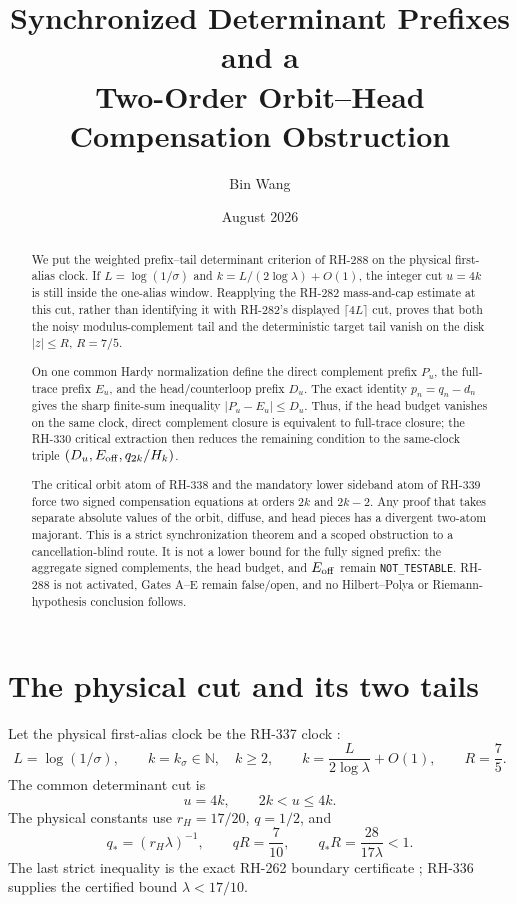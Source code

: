 \documentclass[11pt]{article}
\title{Synchronized Determinant Prefixes and a\\
Two-Order Orbit--Head Compensation Obstruction}
\author{Bin Wang}
\date{August 2026}
\theoremstyle{remark}
\begin{document}
\maketitle

\begin{abstract}
We put the weighted prefix--tail determinant criterion of RH-288
\citep{WangGluing2026} on the physical first-alias clock.  If
$L=\log(1/\sigma)$ and
$k=L/(2\log\lambda)+O(1)$, the integer cut $u=4k$ is still inside the
one-alias window.  Reapplying the RH-282 mass-and-cap estimate at this cut,
rather than identifying it with RH-282's displayed $\lceil4L\rceil$ cut,
proves that both the noisy modulus-complement tail and the deterministic
target tail vanish on the disk $|z|\le R$, $R=7/5$.

On one common Hardy normalization define the direct complement prefix $P_u$,
the full-trace prefix $E_u$, and the head/counterloop prefix $D_u$.  The exact
identity $p_n=q_n-d_n$ gives the sharp finite-sum inequality
$|P_u-E_u|\le D_u$.  Thus, if the head budget vanishes on the same clock,
direct complement closure is equivalent to full-trace closure; the RH-330
critical extraction then reduces the remaining condition to the same-clock
triple $(D_u,E_{\rm off},q_{2k}/H_k)$.

The critical orbit atom of RH-338 and the mandatory lower sideband atom of
RH-339 force two signed compensation equations at orders $2k$ and $2k-2$.
Any proof that takes separate absolute values of the orbit, diffuse, and head
pieces has a divergent two-atom majorant.  This is a strict synchronization
theorem and a scoped obstruction to a cancellation-blind route.  It is not a
lower bound for the fully signed prefix: the aggregate signed complements,
the head budget, and $E_{\rm off}$ remain \texttt{NOT\_TESTABLE}.  RH-288 is not
activated, Gates A--E remain false/open, and no Hilbert--Polya or
Riemann-hypothesis conclusion follows.
\end{abstract}

\section{The physical cut and its two tails}

Let the physical first-alias clock be the RH-337 clock
\citep{WangClock2026}:
\begin{equation}\label{eq:clock}
 L=\log(1/\sigma),\qquad
 k=k_\sigma\in\mathbb N,\quad k\ge2,\qquad
 k=\frac{L}{2\log\lambda}+O(1),
 \qquad R=\frac75.
\end{equation}
The common determinant cut is
\begin{equation}\label{eq:cut}
 u=4k,
 \qquad 2k<u\le4k.
\end{equation}
The physical constants use $r_H=17/20$, $q=1/2$, and
\begin{equation}\label{eq:constants}
 q_*=(r_H\lambda)^{-1},\qquad
 qR=\frac7{10},\qquad
 q_*R=\frac{28}{17\lambda}<1.
\end{equation}
The last strict inequality is the exact RH-262 boundary certificate
\citep{WangBoundaryBudget2026}; RH-336 supplies the certified bound
$\lambda<17/10$\citep{WangProjectorMass2026}.
\end{document}
